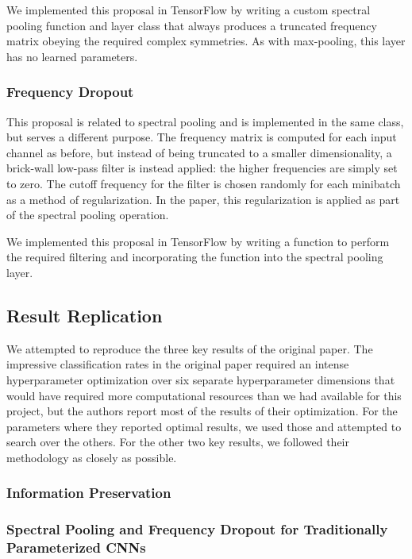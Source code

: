 \documentclass[10pt,journal,compsoc]{IEEEtran}
\begin{document}
We implemented this proposal in TensorFlow by writing a custom spectral pooling function and layer class that always produces a truncated frequency matrix obeying the required complex symmetries. As with max-pooling, this layer has no learned parameters.

\subsubsection{Frequency Dropout}

This proposal is related to spectral pooling and is implemented in the same class, but serves a different purpose. The frequency matrix is computed for each input channel as before, but instead of being truncated to a smaller dimensionality, a brick-wall low-pass filter is instead applied: the higher frequencies are simply set to zero. The cutoff frequency for the filter is chosen randomly for each minibatch as a method of regularization. In the paper, this regularization is applied as part of the spectral pooling operation.

We implemented this proposal in TensorFlow by writing a function to perform the required filtering and incorporating the function into the spectral pooling layer. 

\subsection{Result Replication}

We attempted to reproduce the three key results of the original paper. The impressive classification rates in the original paper required an intense hyperparameter optimization over six separate hyperparameter dimensions that would have required more computational resources than we had available for this project, but the authors report most of the results of their optimization. For the parameters where they reported optimal results, we used those and attempted to search over the others. For the other two key results, we followed their methodology as closely as possible.

\subsubsection{Information Preservation}

\subsubsection{Spectral Pooling and Frequency Dropout for Traditionally Parameterized CNNs}
\end{document}

